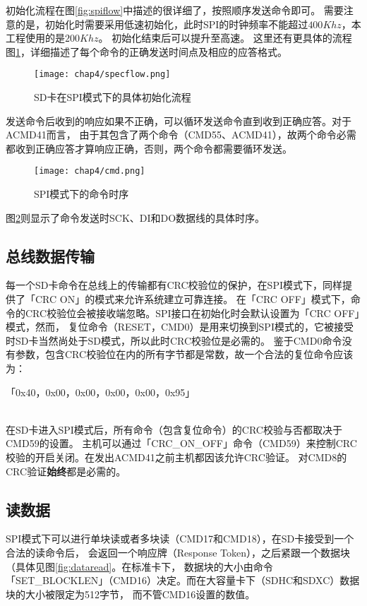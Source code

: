 初始化流程在图\ref{fig:spiflow}中描述的很详细了，按照顺序发送命令即可。
需要注意的是，初始化时需要采用低速初始化，此时SPI的时钟频率不能超过$400Khz$，本工程使用的是$200Khz$。
初始化结束后可以提升至高速。
这里还有更具体的流程图\ref{fig:specflow}，详细描述了每个命令的正确发送时间点及相应的应答格式。
\begin{figure}[!htbp]
    \centering
    \texttt{[image: chap4/specflow.png]}
    \\
    \caption{SD卡在SPI模式下的具体初始化流程}\label{fig:specflow}
\end{figure}
发送命令后收到的响应如果不正确，可以循环发送命令直到收到正确应答。对于ACMD41而言，
由于其包含了两个命令（CMD55、ACMD41），故两个命令必需都收到正确应答才算响应正确，否则，两个命令都需要循环发送。
\begin{figure}[!htb]
    \centering
    \texttt{[image: chap4/cmd.png]}
    \\
    \caption{SPI模式下的命令时序}\label{fig:cmd}
\end{figure}
图\ref{fig:cmd}则显示了命令发送时SCK、DI和DO数据线的具体时序。


\subsection{总线数据传输}
\label{sec:datatrans}
每一个SD卡命令在总线上的传输都有CRC校验位的保护，在SPI模式下，同样提供了「CRC ON」的模式来允许系统建立可靠连接。
在「CRC OFF」模式下，命令的CRC校验位会被接收端忽略。SPI接口在初始化时会默认设置为「CRC OFF」模式，然而，
复位命令（RESET，CMD0）是用来切换到SPI模式的，它被接受时SD卡当然尚处于SD模式，所以此时CRC校验位是必需的。
鉴于CMD0命令没有参数，包含CRC校验位在内的所有字节都是常数，故一个合法的复位命令应该为：\\
\centerline{「0x40，0x00，0x00，0x00，0x00，0x95」}\\
在SD卡进入SPI模式后，所有命令（包含复位命令）的CRC校验与否都取决于CMD59的设置。
主机可以通过「CRC\_ON\_OFF」命令（CMD59）来控制CRC校验的开启关闭。在发出ACMD41之前主机都因该允许CRC验证。
对CMD8的CRC验证\textbf{始终}都是必需的。

\subsection{读数据}
\label{sec:dataread}

SPI模式下可以进行单块读或者多块读（CMD17和CMD18），在SD卡接受到一个合法的读命令后，
会返回一个响应牌（Response Token），之后紧跟一个数据块（具体见图\ref{fig:dataread}。在标准卡下，
数据块的大小由命令「SET\_BLOCKLEN」（CMD16）决定。而在大容量卡下（SDHC和SDXC）数据块的大小被限定为512字节，
而不管CMD16设置的数值。

